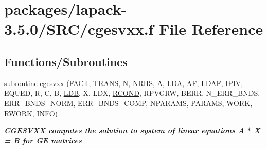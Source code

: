 \hypertarget{cgesvxx_8f}{}\section{packages/lapack-\/3.5.0/\+S\+R\+C/cgesvxx.f File Reference}
\label{cgesvxx_8f}
\subsection*{Functions/\+Subroutines}
\begin{DoxyCompactItemize}
\item 
subroutine \hyperlink{group__complexGEsolve_ga54e141455b3d59923af0a5d79ffebcfb}{cgesvxx} (\hyperlink{superlu__enum__consts_8h_af00a42ecad444bbda75cde1b64bd7e72a1b6692b56d378abb85bd49063721d034}{F\+A\+C\+T}, \hyperlink{superlu__enum__consts_8h_a0c4e17b2d5cea33f9991ccc6a6678d62a1f61e3015bfe0f0c2c3fda4c5a0cdf58}{T\+R\+A\+N\+S}, \hyperlink{polmisc_8c_a0240ac851181b84ac374872dc5434ee4}{N}, \hyperlink{example__user_8c_aa0138da002ce2a90360df2f521eb3198}{N\+R\+H\+S}, \hyperlink{classA}{A}, \hyperlink{example__user_8c_ae946da542ce0db94dced19b2ecefd1aa}{L\+D\+A}, A\+F, L\+D\+A\+F, I\+P\+I\+V, E\+Q\+U\+E\+D, R, C, B, \hyperlink{example__user_8c_a50e90a7104df172b5a89a06c47fcca04}{L\+D\+B}, X, L\+D\+X, \hyperlink{superlu__enum__consts_8h_af00a42ecad444bbda75cde1b64bd7e72a9b5c151728d8512307565994c89919d5}{R\+C\+O\+N\+D}, R\+P\+V\+G\+R\+W, B\+E\+R\+R, N\+\_\+\+E\+R\+R\+\_\+\+B\+N\+D\+S, E\+R\+R\+\_\+\+B\+N\+D\+S\+\_\+\+N\+O\+R\+M, E\+R\+R\+\_\+\+B\+N\+D\+S\+\_\+\+C\+O\+M\+P, N\+P\+A\+R\+A\+M\+S, P\+A\+R\+A\+M\+S, W\+O\+R\+K, R\+W\+O\+R\+K, I\+N\+F\+O)
\begin{DoxyCompactList}\small\item\em {\bfseries  C\+G\+E\+S\+V\+X\+X computes the solution to system of linear equations \hyperlink{classA}{A} $\ast$ X = B for G\+E matrices} \end{DoxyCompactList}\end{DoxyCompactItemize}
